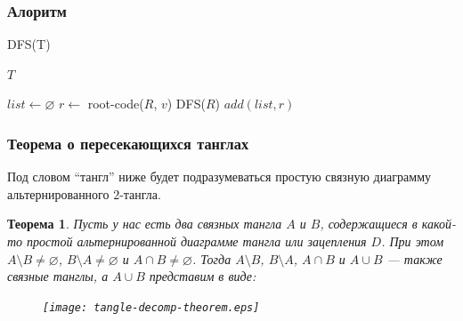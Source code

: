 \documentclass[dvips, intlimits, 9pt, unicode, notheorems]{beamer}
\theoremstyle{plain}
\newtheorem{theorem}{Теорема}
\theoremstyle{definition}
\begin{document}
	\begin{frame}
		\frametitle{Алоритм}

		\begin{block}{DFS(T)}
		{
			\footnotesize
			\begin{algorithmic}[H]
				\PRINT $T$
					\RETURN
				\ENDIF

				\STATE $list \leftarrow \varnothing$
							\STATE $r \leftarrow $ root-code($R$, $v$)
								\STATE DFS($R$)
								\STATE $add(list, r)$
							\ENDIF
						\ENDIF
					\ENDIF
				\ENDFOR
			\end{algorithmic}
		}
		\end{block}
	\end{frame}




	\begin{frame}
		\frametitle{Теорема о пересекающихся танглах}

		Под словом ``тангл'' ниже будет подразумеваться простую связную диаграмму альтернированного $2$-тангла.

		\begin{theorem}
			\label{theorem:tangle-decomp-th}
			Пусть у нас есть два связных тангла $A$ и $B$, содержащиеся в какой-то простой альтернированной диаграмме
			тангла или зацепления $D$. При этом $A\setminus B\neq\varnothing$, $B\setminus A\neq\varnothing$
			и $A\cap B\neq\varnothing$. Тогда $A\setminus B$, $B\setminus A$, $A\cap B$ и $A\cup B$ --- также связные
			танглы, а $A\cup B$ представим в виде:

			\begin{figure}[H]
				\centering
				\texttt{[image: tangle-decomp-theorem.eps]}
			\end{figure}
		\end{theorem}
	\end{frame}
\end{document}
